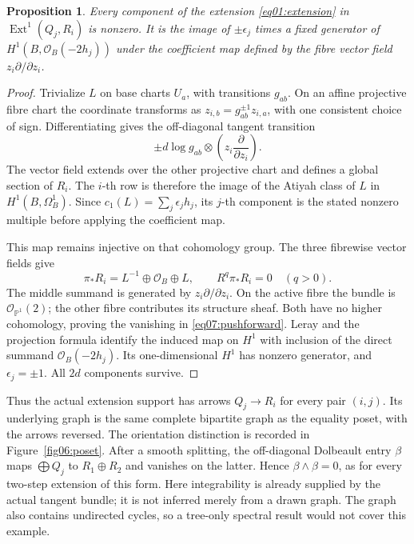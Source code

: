 \documentclass[11pt]{amsart}
\newtheorem{proposition}[theorem]{Proposition}
\theoremstyle{definition}
\theoremstyle{remark}
\newcommand{\PP}{\mathbb P}
\newcommand{\cO}{\mathcal O}
\newcommand{\Ext}{\operatorname{Ext}}
\begin{document}
\begin{proposition}\label{prop07:components}
Every component of the extension \eqref{eq01:extension} in
\(\Ext^1(Q_j,R_i)\) is nonzero. It is the image of
\(\pm\epsilon_j\) times a fixed generator of
\(H^1(B,\cO_B(-2h_j))\) under the coefficient map defined by the
fibre vector field \(z_i\partial/\partial z_i\).
\end{proposition}

\begin{proof}
Trivialize \(L\) on base charts \(U_a\), with transitions \(g_{ab}\).
On an affine projective fibre chart the coordinate transforms as
\(z_{i,b}=g_{ab}^{\pm1}z_{i,a}\), with one consistent choice of sign.
Differentiating gives the off-diagonal tangent transition
\begin{equation}\label{eq07:cocycle}
 \pm d\log g_{ab}\otimes
                \left(z_i\frac{\partial}{\partial z_i}\right).
\end{equation}
The vector field extends over the other projective chart and defines
a global section of \(R_i\). The \(i\)-th row is therefore the
image of the Atiyah class of \(L\) in \(H^1(B,\Omega_B^1)\).
Since \(c_1(L)=\sum_j\epsilon_jh_j\), its \(j\)-th component
is the stated nonzero multiple before applying the coefficient map.

This map remains injective on that cohomology group. The three
fibrewise vector fields give
\begin{equation}\label{eq07:pushforward}
 \pi_*R_i=L^{-1}\oplus\cO_B\oplus L,
 \qquad R^q\pi_*R_i=0\quad(q>0).
\end{equation}
The middle summand is generated by \(z_i\partial/\partial z_i\).
On the active fibre the bundle is \(\cO_{\PP^1}(2)\); the other
fibre contributes its structure sheaf. Both have no higher
cohomology, proving the vanishing in \eqref{eq07:pushforward}.
Leray and the projection formula identify the induced map on
\(H^1\) with inclusion of the direct summand
\(\cO_B(-2h_j)\). Its one-dimensional \(H^1\) has nonzero
generator, and \(\epsilon_j=\pm1\). All \(2d\) components survive.
\end{proof}

Thus the actual extension support has arrows \(Q_j\to R_i\) for
every pair \((i,j)\). Its underlying graph is the same complete
bipartite graph as the equality poset, with the arrows reversed.
The orientation distinction is recorded in Figure~\ref{fig06:poset}.
After a smooth splitting, the off-diagonal Dolbeault entry \(\beta\)
maps \(\bigoplus Q_j\) to \(R_1\oplus R_2\) and vanishes on
the latter. Hence \(\beta\wedge\beta=0\), as for every two-step
extension of this form. Here integrability is already supplied by
the actual tangent bundle; it is not inferred merely from a drawn
graph. The graph also contains undirected cycles, so a tree-only
spectral result would not cover this example.
\end{document}
